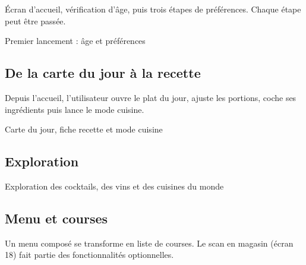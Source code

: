 Écran d'accueil, vérification d'âge, puis trois étapes de préférences. Chaque
étape peut être passée.

\begin{planche}{Premier lancement : âge et préférences}
\end{planche}

\subsection{De la carte du jour à la recette}

Depuis l'accueil, l'utilisateur ouvre le plat du jour, ajuste les portions,
coche ses ingrédients puis lance le mode cuisine.

\begin{planche}{Carte du jour, fiche recette et mode cuisine}
\end{planche}

\subsection{Exploration}

\begin{planche}{Exploration des cocktails, des vins et des cuisines du monde}
\end{planche}

\subsection{Menu et courses}

Un menu composé se transforme en liste de courses. Le scan en magasin
(écran 18) fait partie des fonctionnalités optionnelles.


